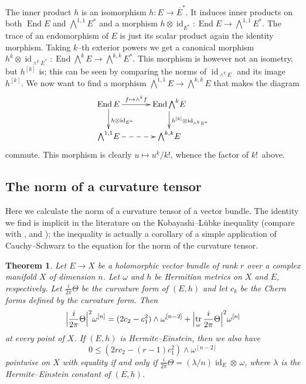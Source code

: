 \documentclass[11pt,a4paper]{amsart}
\def\^#1{^{[#1]}}
\DeclareMathOperator{\tr}{tr}
\DeclareMathOperator{\id}{id}
\DeclareMathOperator{\End}{End}
\def\curv{\frac{i}{2\pi} \Theta}
\newtheorem{theo}{Theorem}[section]
\theoremstyle{definition}
\theoremstyle{remark}
\numberwithin{equation}{section}
\begin{document}
The inner product $h$ is an isomorphism $h : E \to \overline E^*$. It
induces inner products on both $\End E$ and $\bigwedge^{1,1} \! E^*$ and a
morphism $h  \otimes \id_{E^*}: \End E \to \bigwedge^{1,1} \!
E^*$. The trace of an endomorphism of $E$ is just its scalar product
again the identity morphism.  Taking $k$--th exterior powers we get a
canonical morphism
$h^k \otimes \id_{\wedge^k E^*} : \End \bigwedge^k \! E \to
\bigwedge^{k,k} \! E^*$. This morphism is however not an isometry, but
$h\^k$ is; this can be seen by comparing the norms of $\id_{\wedge^k
E}$ and its image $h\^k$. We now want to find a morphism
$\bigwedge^{1,1} \! E \to \bigwedge^{k,k} \! E$ that makes the diagram
$$
\xymatrix@C+10pt@R-3pt{
    \End E \ar[r]^-{f \mapsto \wedge^k f} \ar[d]^{h \otimes \id_{E^*}} & 
    \End \bigwedge^{k} \! E \ar[d]^{h\^k \otimes \id_{\wedge^k E^*}} \\
    \bigwedge^{1,1} \! E \ar@{-->}[r] 
    & \bigwedge^{k,k} \! E
}
$$
commute. This morphism is clearly $u \mapsto u^k / k!$, whence the factor
of $k!$~above.%



\subsection*{The norm of a curvature tensor}

Here we calculate the norm of a curvature tensor of a vector
bundle. The identity we find is implicit in the literature on the
Kobayashi--L\"{u}bke inequality (compare with \cite{Chen-Ogiue},
\cite{Lubke} and \cite{Siu}); the inequality is actually a corollary of a
simple application of Cauchy--Schwarz to the equation for the norm of the
curvature tensor.

\begin{theo}
    Let $E \to X$ be a holomorphic vector bundle of rank $r$ over a complex
manifold $X$ of dimension $n$. Let $\omega$ and $h$ be Hermitian metrics on
$X$ and $E$, respectively. Let $\curv$ be the curvature form of $(E,h)$
and let $c_k$ be the Chern forms defined by the curvature form. Then
$$
\Bigl\lvert \curv \Bigr\rvert^2 \omega\^n
= (2 c_2 - c_1^2) \wedge \omega\^{n-2}
+ \Bigl\lvert \tr_\omega \curv \Bigr\rvert^2 \omega\^n
$$
at every point of $X$. If $(E,h)$ is Hermite--Einstein, then we also have
$$
0 \leq 
(2r c_2 - (r-1) c_1^2) \wedge \omega\^{n-2}
$$
pointwise on $X$ with equality if and only if $\curv = (\lambda/n) \id_E
\otimes\, \omega$, where $\lambda$ is the Hermite--Einstein constant of
$(E,h)$.
\end{theo}
\end{document}
